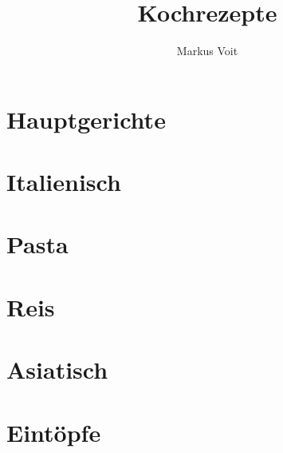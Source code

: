 \documentclass[DIV=11, pagesize, fontsize=11pt, paper=a4, numbers=noenddot]{scrartcl}
\title{Kochrezepte}
\author{Markus Voit}
\begin{document}
\maketitle

\tableofcontents
\clearpage

\section{Hauptgerichte}
\newpage{}
\newpage{}
\newpage{}

\section{Italienisch}
\newpage{}
\newpage{}
\newpage{}
\newpage{}

\section{Pasta}
\newpage{}
\newpage{}
\newpage{}
\newpage{}
\newpage{}

\section{Reis}
\newpage{}

\section{Asiatisch}
\newpage{}
\newpage{}
\newpage{}

\section{Eintöpfe}
\newpage{}
\newpage{}
\newpage{}
\newpage{}
\newpage{}
\newpage{}
\newpage{}
\newpage{}
\end{document}
